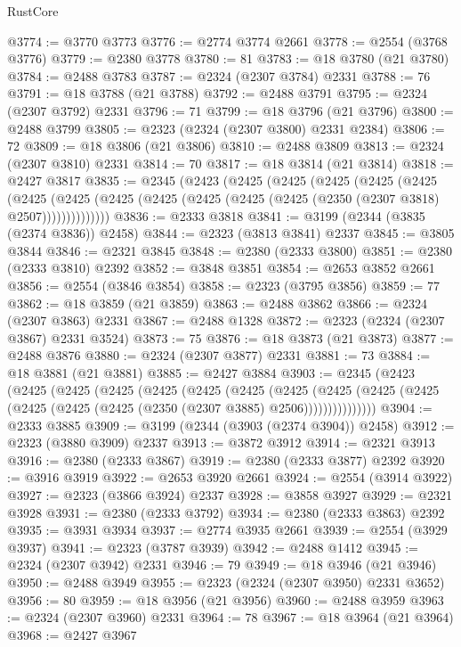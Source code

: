 \begin{lexlean}{RustCore}
\begin{coremodule}
@3774 := @3770 @3773
@3776 := @2774 @3774 @2661
@3778 := @2554 (@3768 @3776)
@3779 := @2380 @3778
@3780 := 81
@3783 := @18 @3780 (@21 @3780)
@3784 := @2488 @3783
@3787 := @2324 (@2307 @3784) @2331
@3788 := 76
@3791 := @18 @3788 (@21 @3788)
@3792 := @2488 @3791
@3795 := @2324 (@2307 @3792) @2331
@3796 := 71
@3799 := @18 @3796 (@21 @3796)
@3800 := @2488 @3799
@3805 := @2323 (@2324 (@2307 @3800) @2331 @2384)
@3806 := 72
@3809 := @18 @3806 (@21 @3806)
@3810 := @2488 @3809
@3813 := @2324 (@2307 @3810) @2331
@3814 := 70
@3817 := @18 @3814 (@21 @3814)
@3818 := @2427 @3817
@3835 := @2345
    (@2423
      (@2425
        (@2425
          (@2425
            (@2425
              (@2425
                (@2425
                  (@2425 (@2425 (@2425 (@2425 (@2425 (@2425 (@2350 (@2307 @3818) @2507))))))))))))))
@3836 := @2333 @3818
@3841 := @3199 (@2344 (@3835 (@2374 @3836)) @2458)
@3844 := @2323 (@3813 @3841) @2337
@3845 := @3805 @3844
@3846 := @2321 @3845
@3848 := @2380 (@2333 @3800)
@3851 := @2380 (@2333 @3810) @2392
@3852 := @3848 @3851
@3854 := @2653 @3852 @2661
@3856 := @2554 (@3846 @3854)
@3858 := @2323 (@3795 @3856)
@3859 := 77
@3862 := @18 @3859 (@21 @3859)
@3863 := @2488 @3862
@3866 := @2324 (@2307 @3863) @2331
@3867 := @2488 @1328
@3872 := @2323 (@2324 (@2307 @3867) @2331 @3524)
@3873 := 75
@3876 := @18 @3873 (@21 @3873)
@3877 := @2488 @3876
@3880 := @2324 (@2307 @3877) @2331
@3881 := 73
@3884 := @18 @3881 (@21 @3881)
@3885 := @2427 @3884
@3903 := @2345
    (@2423
      (@2425
        (@2425
          (@2425
            (@2425
              (@2425
                (@2425
                  (@2425
                    (@2425
                      (@2425 (@2425 (@2425 (@2425 (@2425 (@2350 (@2307 @3885) @2506)))))))))))))))
@3904 := @2333 @3885
@3909 := @3199 (@2344 (@3903 (@2374 @3904)) @2458)
@3912 := @2323 (@3880 @3909) @2337
@3913 := @3872 @3912
@3914 := @2321 @3913
@3916 := @2380 (@2333 @3867)
@3919 := @2380 (@2333 @3877) @2392
@3920 := @3916 @3919
@3922 := @2653 @3920 @2661
@3924 := @2554 (@3914 @3922)
@3927 := @2323 (@3866 @3924) @2337
@3928 := @3858 @3927
@3929 := @2321 @3928
@3931 := @2380 (@2333 @3792)
@3934 := @2380 (@2333 @3863) @2392
@3935 := @3931 @3934
@3937 := @2774 @3935 @2661
@3939 := @2554 (@3929 @3937)
@3941 := @2323 (@3787 @3939)
@3942 := @2488 @1412
@3945 := @2324 (@2307 @3942) @2331
@3946 := 79
@3949 := @18 @3946 (@21 @3946)
@3950 := @2488 @3949
@3955 := @2323 (@2324 (@2307 @3950) @2331 @3652)
@3956 := 80
@3959 := @18 @3956 (@21 @3956)
@3960 := @2488 @3959
@3963 := @2324 (@2307 @3960) @2331
@3964 := 78
@3967 := @18 @3964 (@21 @3964)
@3968 := @2427 @3967

\end{coremodule}
\end{lexlean}
